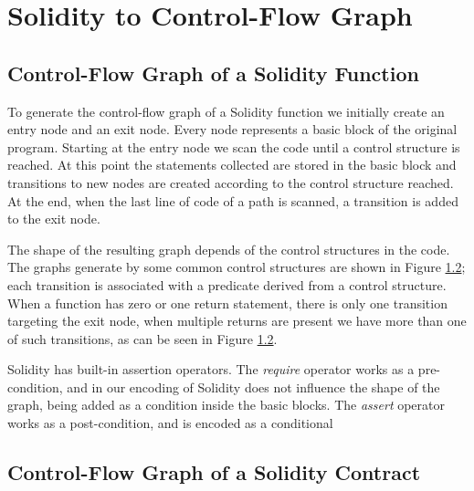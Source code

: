 \section{Solidity to Control-Flow Graph}


\subsection{Control-Flow Graph of a Solidity Function}

To generate the control-flow graph of a Solidity function we initially create an entry node and an exit node. Every node represents a basic block of the original program. Starting at the entry node we scan the code until a control structure is reached. At this point the statements collected are stored in the basic block and transitions to new nodes are created according to the control structure reached. At the end, when the last line of code of a path is scanned, a transition is added to the exit node.

The shape of the resulting graph depends of the control structures in the code. The graphs generate by some common control structures are shown in Figure \ref{}; each transition is associated with a predicate derived from a control structure. When a function has zero or one return statement, there is only one transition targeting the exit node, when multiple returns are present we have more than one of such transitions, as can be seen in Figure \ref{}. 

Solidity has built-in assertion operators. The \textit{require} operator works as a pre-condition, and in our encoding of Solidity does not influence the shape of the graph, being added as a condition inside the basic blocks. The \textit{assert} operator works as a post-condition, and is encoded as a conditional


\subsection{Control-Flow Graph of a Solidity Contract}

